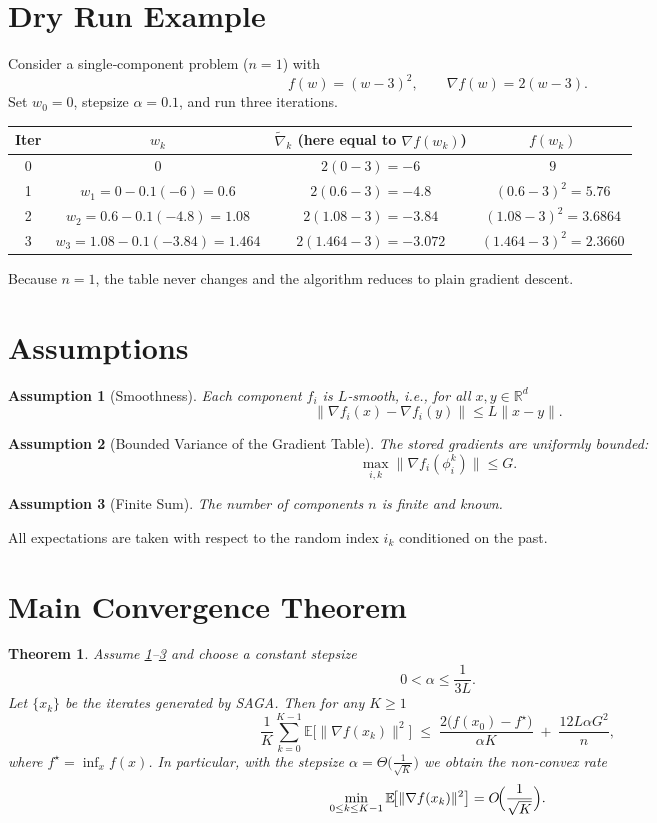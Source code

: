 \documentclass{article}
\newtheorem{theorem}{Theorem}
\newtheorem{assumption}{Assumption}
\newcommand{\E}{\mathbb{E}}
\newcommand{\R}{\mathbb{R}}
\begin{document}
\section*{Dry Run Example}
Consider a single‑component problem ($n=1$) with  
\[
f(w)=(w-3)^2,\qquad \nabla f(w)=2(w-3).
\]
Set $w_0=0$, stepsize $\alpha=0.1$, and run three iterations.

\begin{center}
\begin{tabular}{c|c|c|c}
\textbf{Iter} & $w_k$ & $\widetilde{\nabla}_k$ (here equal to $\nabla f(w_k)$) & $f(w_k)$\\ \hline
0 & $0$ & $2(0-3)=-6$ & $9$\\
1 & $w_1=0-0.1(-6)=0.6$ & $2(0.6-3)=-4.8$ & $(0.6-3)^2=5.76$\\
2 & $w_2=0.6-0.1(-4.8)=1.08$ & $2(1.08-3)=-3.84$ & $(1.08-3)^2=3.6864$\\
3 & $w_3=1.08-0.1(-3.84)=1.464$ & $2(1.464-3)=-3.072$ & $(1.464-3)^2=2.3660$
\end{tabular}
\end{center}
Because $n=1$, the table never changes and the algorithm reduces to plain gradient descent.

\section*{Assumptions}
\begin{assumption}[Smoothness]\label{ass:smooth}
Each component $f_i$ is $L$‑smooth, i.e., for all $x,y\in\R^{d}$
\[
\|\nabla f_i(x)-\nabla f_i(y)\|\le L\|x-y\|.
\]
\end{assumption}
\begin{assumption}[Bounded Variance of the Gradient Table]\label{ass:bounded}
The stored gradients are uniformly bounded:
\[
\max_{i,k}\|\nabla f_i(\phi_i^{k})\|\le G.
\]
\end{assumption}
\begin{assumption}[Finite Sum]\label{ass:finite}
The number of components $n$ is finite and known.
\end{assumption}
All expectations are taken with respect to the random index $i_k$ conditioned on the past.

\section*{Main Convergence Theorem}
\begin{theorem}\label{thm:main}
Assume \ref{ass:smooth}–\ref{ass:finite} and choose a constant stepsize 
\[
0<\alpha\le\frac{1}{3L}.
\]
Let $\{x_k\}$ be the iterates generated by SAGA. Then for any $K\ge1$
\[
\frac{1}{K}\sum_{k=0}^{K-1}\E\!\bigl[\|\nabla f(x_k)\|^{2}\bigr]
\;\le\;
\frac{2\bigl(f(x_0)-f^{\star}\bigr)}{\alpha K}
\;+\;
\frac{12L\alpha G^{2}}{n},
\tag{3}
\]
where $f^{\star}=\inf_{x}f(x)$. In particular, with the stepsize 
$\alpha=\Theta\!\bigl(\frac{1}{\sqrt{K}}\bigr)$ we obtain the non‑convex rate
\[
\min_{0\le k\le K-1}\E\!\bigl[\|\nabla f(x_k)\|^{2}\bigr]=O\!\Bigl(\frac{1}{\sqrt{K}}\Bigr).
\]
\end{theorem}
\end{document}
